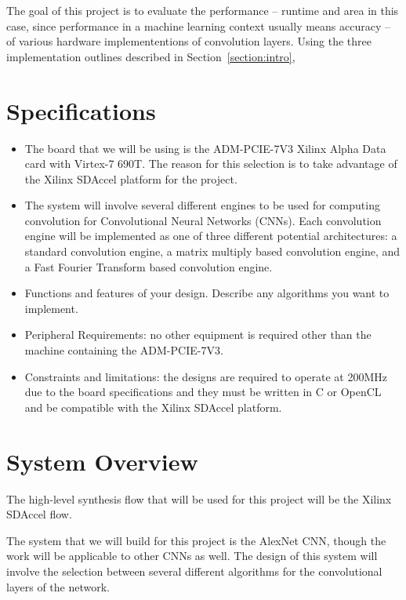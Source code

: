 \documentclass[conference,compsoc]{IEEEtran/IEEEtran}
\begin{document}
The goal of this project is to evaluate the performance -- runtime and area in this case, since performance in a machine learning context usually means accuracy -- of various hardware implemententions of convolution layers.
Using the three implementation outlines described in Section~\ref{section:intro}, 

\section{Specifications}\label{section:spec}
\begin{itemize}
\item The board that we will be using is the ADM-PCIE-7V3 Xilinx Alpha Data card
with Virtex-7 690T. The reason for this selection is to take advantage of the
Xilinx SDAccel platform for the project.

\item The system will involve several different engines to be used for computing
convolution for Convolutional Neural Networks (CNNs). Each convolution engine
will be implemented as one of three different potential architectures: a standard
convolution engine, a matrix multiply based convolution engine, and a Fast Fourier
Transform based convolution engine.

\item Functions and features of your design.
Describe any algorithms you want to implement.


\item Peripheral Requirements: no other equipment is required other than the machine
containing the ADM-PCIE-7V3.
\item Constraints and limitations: the designs are required to operate at 200MHz due
to the board specifications and they must be written in C or OpenCL and be compatible
with the Xilinx SDAccel platform.
\end{itemize}

\section{System Overview}\label{section:overview}

The high-level synthesis flow that will be used for this project will be the Xilinx
SDAccel flow.

The system that we will build for this project is the AlexNet CNN, though the work
will be applicable to other CNNs as well. The design of this system will involve the
selection between several different algorithms for the convolutional layers of the
network.
\end{document}
